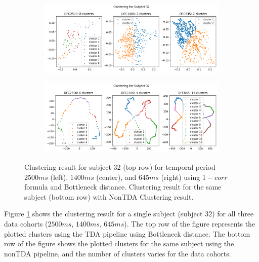 \begin{figure}[!th]
	\centering
	\begin{subfigure}[!th]{1\textwidth}
		\centering
		\hspace{8mm}
		\includegraphics[width=1\textwidth, trim={0cm, 0.0cm, 0.0cm, 0.0cm}]{figures/new_formula_tda_bn_subject_32.png}\hfill
	\end{subfigure}
	\begin{subfigure}[!th]{1\textwidth}
		\centering
		\hspace{8mm}
		\includegraphics[width=1\textwidth, trim={0cm, 0.0cm, 0.0cm, 0.0cm}]{figures/new_formula_nontda_subject_32.png}\hfill
	\end{subfigure}
	\caption{Clustering result for subject $32$ (top row) for temporal period $2500ms$ (left), $1400ms$ (center), and $645ms$ (right) using $1 - corr$ formula and Bottleneck distance. Clustering result for the same subject (bottom row) with NonTDA Clustering result.}
	\label{fig:clus_new_formula}
\end{figure}

Figure \ref{fig:clus_new_formula} shows the clustering result for a single subject (subject 32) for all three data cohorts ($2500ms$, $1400ms$, $645ms$). The top row of the figure represents the plotted clusters using the TDA pipeline using Bottleneck distance. The bottom row of the figure shows the plotted clusters for the same subject using the nonTDA pipeline, and the number of clusters varies for the data cohorts. 

